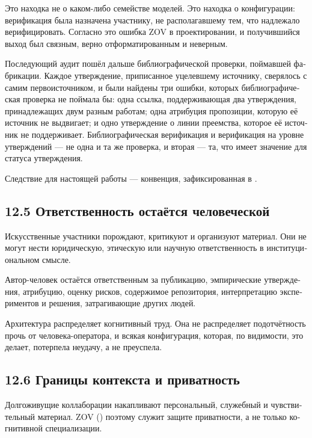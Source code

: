 \begin{russian}
Это находка не о каком-либо семействе моделей. Это находка о конфигурации: верификация была назначена участнику, не располагавшему тем, что надлежало верифицировать. Согласно  это ошибка ZOV в проектировании, и получившийся выход был связным, верно отформатированным и неверным.

Последующий аудит пошёл дальше библиографической проверки, поймавшей фабрикации. Каждое утверждение, приписанное уцелевшему источнику, сверялось с самим первоисточником, и были найдены три ошибки, которых библиографическая проверка не поймала бы: одна ссылка, поддерживающая два утверждения, принадлежащих двум разным работам; одна атрибуция пропозиции, которую её источник не выдвигает; и одно утверждение о линии преемства, которое её источник не поддерживает. Библиографическая верификация и верификация на уровне утверждений — не одна и та же проверка, и вторая — та, что имеет значение для статуса утверждения.

Следствие для настоящей работы — конвенция, зафиксированная в .


\subsection*{12.5 Ответственность остаётся человеческой}
\label{sec:ru:12.5}

Искусственные участники порождают, критикуют и организуют материал. Они не могут нести юридическую, этическую или научную ответственность в институциональном смысле.

Автор-человек остаётся ответственным за публикацию, эмпирические утверждения, атрибуцию, оценку рисков, содержимое репозитория, интерпретацию экспериментов и решения, затрагивающие других людей.

Архитектура распределяет когнитивный труд. Она не распределяет подотчётность прочь от человека-оператора, и всякая конфигурация, которая, по видимости, это делает, потерпела неудачу, а не преуспела.


\subsection*{12.6 Границы контекста и приватность}
\label{sec:ru:12.6}

Долгоживущие коллаборации накапливают персональный, служебный и чувствительный материал. ZOV () поэтому служит защите приватности, а не только когнитивной специализации.


\end{russian}
